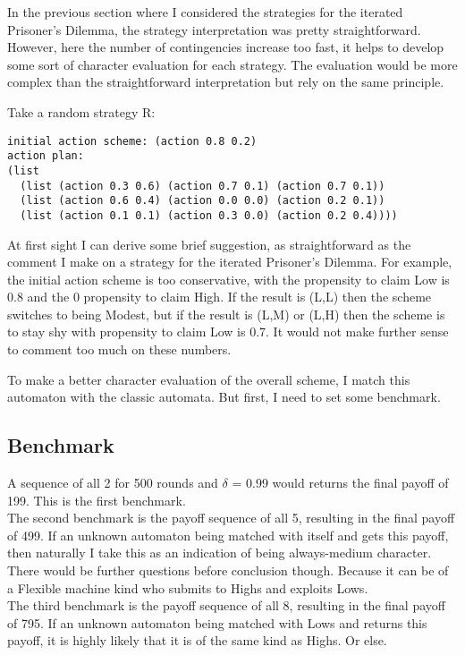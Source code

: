 \documentclass[12.5pt]{report}
\begin{document}
In the previous section where I considered the strategies for the iterated Prisoner's Dilemma, the strategy interpretation was pretty straightforward. However, here the number of contingencies increase too fast, it helps to develop some sort of character evaluation for each strategy. The evaluation would be more complex than the straightforward interpretation but rely on the same principle.

Take a random strategy R:

\begin{verbatim}
initial action scheme: (action 0.8 0.2)
action plan:
(list
  (list (action 0.3 0.6) (action 0.7 0.1) (action 0.7 0.1))
  (list (action 0.6 0.4) (action 0.0 0.0) (action 0.2 0.1))
  (list (action 0.1 0.1) (action 0.3 0.0) (action 0.2 0.4))))

\end{verbatim}

At first sight I can derive some brief suggestion, as straightforward as the comment I make on a strategy for the iterated Prisoner's Dilemma. For example, the initial action scheme is too conservative, with the propensity to claim Low is 0.8 and the 0 propensity to claim High. If the result is (L,L) then the scheme switches to being Modest, but if the result is (L,M) or (L,H) then the scheme is to stay shy with propensity to claim Low is 0.7. It would not make further sense to comment too much on these numbers.

To make a better character evaluation of the overall scheme, I match this automaton with the classic automata. But first, I need to set some benchmark.

\subsection{Benchmark}

A sequence of all 2 for 500 rounds and $\delta$ = 0.99 would returns the final payoff of 199. This is the first benchmark.\\

The second benchmark is the payoff sequence of all 5, resulting in the final payoff of 499. If an unknown automaton being matched with itself and gets this payoff, then naturally I take this as an indication of being always-medium character. There would be further questions before conclusion though. Because it can be of a Flexible machine kind who submits to Highs and exploits Lows.\\

The third benchmark is the payoff sequence of all 8, resulting in the final payoff of 795. If an unknown automaton being matched with Lows and returns this payoff, it is highly likely that it is of the same kind as Highs. Or else.\\
\end{document}
